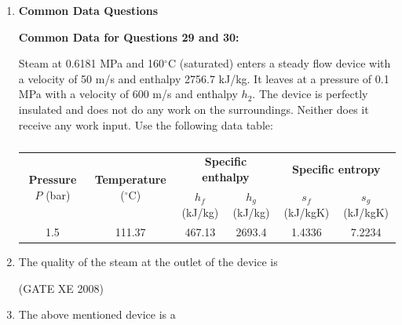 \documentclass[12pt]{article}
\begin{document}
\begin{enumerate}
(GATE XE 2008)  


\item[] \textbf{\Large Common Data Questions}

\textbf{Common Data for Questions 29 and 30:}  

Steam at 0.6181 MPa and 160$^\circ$C (saturated) enters a steady flow device with a velocity of 50 m/s and enthalpy 2756.7 kJ/kg. It leaves at a pressure of 0.1 MPa with a velocity of 600 m/s and enthalpy $h_2$. The device is perfectly insulated and does not do any work on the surroundings. Neither does it receive any work input. Use the following data table:  

\begin{table}[H]     \centering     \caption{}     \label{}     \begin{tabular}{|c|c|c|c|c|c|}
\hline
\multirow{2}{*}{\textbf{Pressure} $P$ (bar)} & 
\multirow{2}{*}{\textbf{Temperature} ($^{\circ}$C)} & 
\multicolumn{2}{c|}{\textbf{Specific enthalpy}} & 
\multicolumn{2}{c|}{\textbf{Specific entropy}} \\ \cline{3-6}
 & & $h_f$ (kJ/kg) & $h_g$ (kJ/kg) & $s_f$ (kJ/kgK) & $s_g$ (kJ/kgK) \\ \hline
1.5 & 111.37 & 467.13 & 2693.4 & 1.4336 & 7.2234 \\ \hline
\end{tabular} \end{table}


\item The quality of the steam at the outlet of the device is  
\begin{enumerate}
\end{enumerate}

 (GATE XE 2008)  

\item The above mentioned device is a  

\begin{enumerate}
\end{enumerate}


\end{enumerate}
\end{document}
